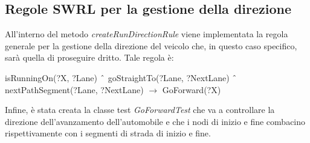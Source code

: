 \subsection{Regole SWRL per la gestione della direzione}\label{SWRLrundirection}
All'interno del metodo \textit{createRunDirectionRule} viene implementata la regola generale per la gestione della direzione del veicolo che, in questo caso specifico, sar\`a quella di proseguire dritto.
Tale regola \`e:
\begin{center}
isRunningOn(?X, ?Lane) $\char`\^$ goStraightTo(?Lane, ?NextLane) $\char`\^$ nextPathSegment(?Lane, ?NextLane) $\rightarrow$ GoForward(?X)
\end{center}

Infine, \`e stata creata la classe test \textit{GoForwardTest} che va a controllare la direzione dell'avanzamento dell'automobile e che i nodi di inizio e fine combacino rispettivamente con i segmenti di strada di inizio e fine. 
